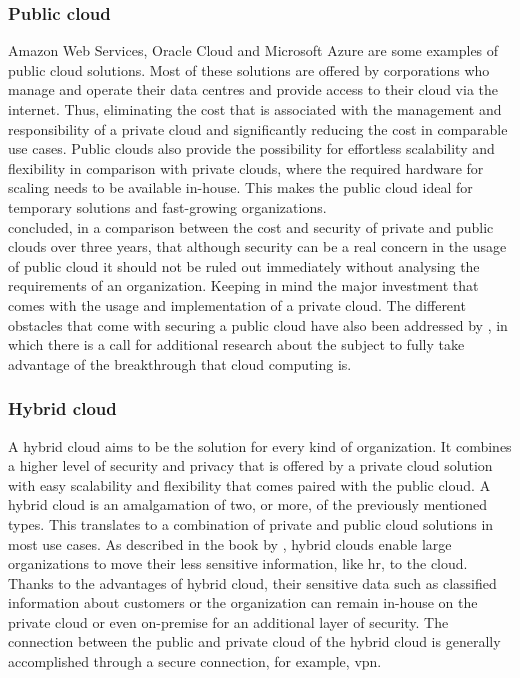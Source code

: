 \subsubsection{Public cloud}
Amazon Web Services, Oracle Cloud and Microsoft Azure are some examples of public cloud solutions. 
Most of these solutions are offered by corporations who manage and operate their data centres and provide access to their cloud via the internet. 
Thus, eliminating the cost that is associated with the management and responsibility of a private cloud and significantly reducing the cost in comparable use cases. 
Public clouds also provide the possibility for effortless scalability and flexibility in comparison with private clouds, where the required hardware for scaling needs to be available in-house. 
This makes the public cloud ideal for temporary solutions and fast-growing organizations.
\\
\textcite{Singh2012} concluded, in a comparison between the cost and security of private and public clouds over three years, that although security can be a real concern in the usage of public cloud it should not be ruled out immediately without analysing the requirements of an organization. 
Keeping in mind the major investment that comes with the usage and implementation of a private cloud.  
The different obstacles that come with securing a public cloud have also been addressed by \textcite{Ren2012}, in which there is a call for additional research about the subject to fully take advantage of the breakthrough that cloud computing is. 

\subsubsection{Hybrid cloud}
A hybrid cloud aims to be the solution for every kind of organization. 
It combines a higher level of security and privacy that is offered by a private cloud solution with easy scalability and flexibility that comes paired with the public cloud. 
A hybrid cloud is an amalgamation of two, or more, of the previously mentioned types. 
This translates to a combination of private and public cloud solutions in most use cases. 
As described in the book by \textcite{Sarna2010}, hybrid clouds enable large organizations to move their less sensitive information, like \acrfull{hr}, to the cloud. 
Thanks to the advantages of hybrid cloud, their sensitive data such as classified information about customers or the organization can remain in-house on the private cloud or even on-premise for an additional layer of security.
The connection between the public and private cloud of the hybrid cloud is generally accomplished through a secure connection, for example, \acrfull{vpn}.


